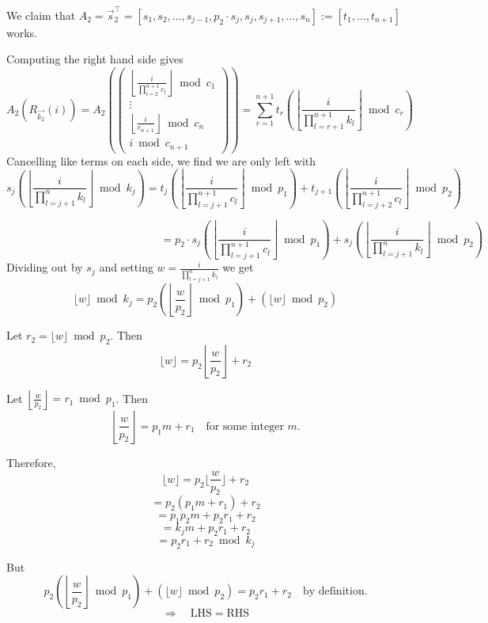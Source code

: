\documentclass{article}
\begin{document}
We claim that $A_2 = \vec{s}_2^{\top} = [s_1, s_2, \ldots, s_{j-1}, p_2 \cdot s_j, s_j, s_{j+1}, \ldots, s_n] := [t_1, \ldots, t_{n+1}]$ works.

Computing the right hand side gives
\[A_2(R_{\vec{k_2}}(i))=A_2(\begin{pmatrix}
\left\lfloor \frac{i}{\prod_{l=2}^{n+1} c_l} \right\rfloor \bmod c_1 \\
\vdots \\
\left\lfloor \frac{i}{c_{n+1}} \right\rfloor \bmod c_{n} \\
i \bmod c_{n+1}
\end{pmatrix})=\sum_{r=1}^{n+1} t_r \left( \left\lfloor \frac{i}{\prod_{l=r+1}^{n+1} k_l} \right\rfloor \bmod c_r \right)
\]
Cancelling like terms on each side, we find we are only left with
\[
s_{j} \left( \left\lfloor \frac{i}{\prod_{l=j+1}^{n} k_{l}} \right\rfloor \bmod k_{j} \right) = t_{j} \left( \left\lfloor \frac{i}{\prod_{l=j+1}^{n+1} c_{l}} \right\rfloor \bmod p_{1} \right) + t_{j+1} \left( \left\lfloor \frac{i}{\prod_{l=j+2}^{n+1} c_{l}} \right\rfloor \bmod p_{2} \right)
\]

\vspace{0.5em}

\[
\phantom{s_{j} \left( \left\lfloor \frac{i}{\prod_{l=j+1}^{n} k_{l}} \right\rfloor \bmod k_{j} \right) =} 
=p_2 \cdot s_j \left( \left\lfloor \frac{i}{\prod_{l=j+1}^{n+1} c_{l}} \right\rfloor \bmod p_{1} \right) + s_j \left( \left\lfloor \frac{i}{\prod_{l=j+1}^{n} k_{l}} \right\rfloor \bmod p_{2} \right)
\]
Dividing out by $s_j$ and setting $w=\frac{i}{\prod_{l=j+1}^{n} k_{l}}$ we get 
\[
\lfloor{w}\rfloor \bmod k_j = p_2 \left( \left\lfloor \frac{w}{p_2} \right\rfloor \bmod p_1 \right) + \left(\lfloor{w}\rfloor \bmod p_2 \right) \tag{1}
\]

Let $r_2 = \lfloor w \rfloor \bmod p_2$. Then
\[
\lfloor w \rfloor = p_2 \left\lfloor \frac{w}{p_2} \right\rfloor + r_2
\]

Let $\left\lfloor \frac{w}{p_2} \right\rfloor = r_1 \bmod p_1$. Then
\[
\left\lfloor \frac{w}{p_2} \right\rfloor = p_1 m + r_1 \quad \text{for some integer } m.
\]

Therefore,
\[
\lfloor w \rfloor = p_2 \lfloor \frac{w}{p_2} \rfloor + r_2
\]
\[
= p_2 \left( p_1 m + r_1 \right) + r_2
\]
\[
= p_1 p_2 m + p_2 r_1 + r_2
\]
\[
= k_j m + p_2 r_1 + r_2
\]
\[
= p_2 r_1 + r_2 \bmod k_j
\]

But
\[
p_2 \left( \left\lfloor \frac{w}{p_2} \right\rfloor \bmod p_1 \right) + \left( \lfloor w \rfloor \bmod p_2 \right) = p_2 r_1 + r_2 \quad \text{by definition.}
\]
\[
\Rightarrow \quad \text{LHS} = \text{RHS}
\]
\end{document}
